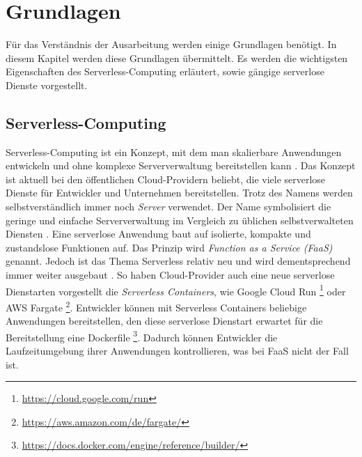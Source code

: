 \chapter{Grundlagen}
Für das Verständnis der Ausarbeitung werden einige Grundlagen benötigt.
In diesem Kapitel werden diese Grundlagen übermittelt.
Es werden die wichtigsten Eigenschaften des Serverless-Computing erläutert,
sowie gängige serverlose Dienste vorgestellt.

\section{Serverless-Computing}
Serverless-Computing ist ein Konzept, mit dem man skalierbare Anwendungen
entwickeln und ohne komplexe Serververwaltung bereitstellen kann \cite{CioGov}.
Das Konzept ist aktuell bei den öffentlichen Cloud-Providern beliebt, die viele
serverlose Dienste für Entwickler und Unternehmen bereitstellen. Trotz des Namens
werden selbstverständlich immer noch \textit{Server} verwendet. Der Name symbolisiert die geringe
und einfache Serververwaltung im Vergleich zu üblichen selbstverwalteten
Diensten \cite{CNCF}. Eine serverlose Anwendung baut auf
isolierte, kompakte und zustandslose Funktionen auf. Das Prinzip
wird \textit{Function as a Service (FaaS)} genannt. Jedoch ist das Thema
Serverless relativ neu und wird dementsprechend immer weiter
ausgebaut \cite{ServerlessTrends}.
So haben Cloud-Provider auch eine neue serverlose Dienstarten
vorgestellt die \textit{Serverless Containers}, wie Google Cloud Run
\footnote{\url{https://cloud.google.com/run}} oder AWS Fargate
\footnote{\url{https://aws.amazon.com/de/fargate/}}. Entwickler
können mit Serverless Containers beliebige Anwendungen bereitstellen,
den diese serverlose Dienstart erwartet für die Bereitstellung
eine Dockerfile \footnote{\url{https://docs.docker.com/engine/reference/builder/}}.
Dadurch können Entwickler die Laufzeitumgebung ihrer Anwendungen
kontrollieren, was bei FaaS nicht der Fall ist.

